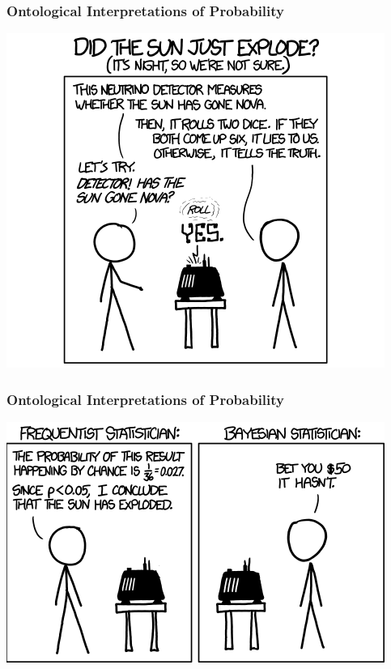 \documentclass{beamer}
\begin{document}
\begin{frame}
  \frametitle{Ontological Interpretations of Probability}

  \begin{center}
  \includegraphics[height=0.8\textheight]{img/frequentists_vs_bayesians-1.png}
  \end{center}

\end{frame}

\begin{frame}
  \frametitle{Ontological Interpretations of Probability}

  \begin{center}
  \includegraphics[width=\textwidth]{img/frequentists_vs_bayesians-2.png}    
  \end{center}

\end{frame}
\end{document}
